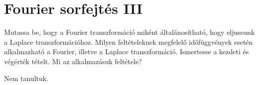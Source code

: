 \documentclass[../main.tex]{subfiles}
\begin{document}
\section{Fourier sorfejtés III}

\begin{fulltheorem}
  Mutassa be, hogy a Fourier transzformáció miként általánosítható,
  hogy eljussunk a Laplace transzformációhoz. Milyen feltételeknek megfelelő
  időfüggvények esetén alkalmazható a Fourier, illetve a Laplace transzformáció.
  Ismertesse a kezdeti és végérték tételt. Mi az alkalmazásuk feltétele?
\end{fulltheorem}

Nem tanultuk.
\end{document}
